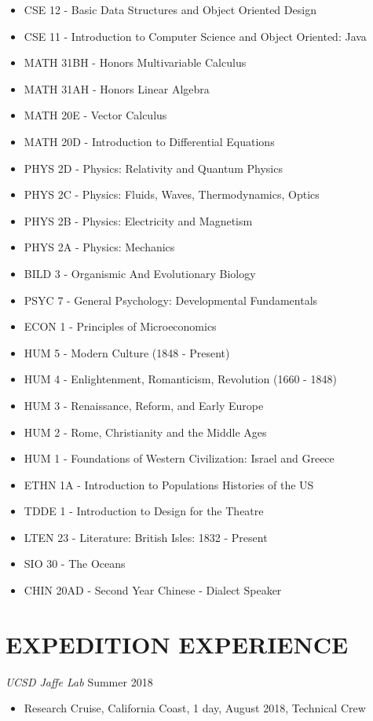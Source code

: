 \documentclass[line,margin]{res}
\begin{document}
\begin{resume}
\begin{itemize}
		\item CSE 12 - Basic Data Structures and Object Oriented Design
		\item CSE 11 - Introduction to Computer Science and Object Oriented: Java
		\item MATH 31BH - Honors Multivariable Calculus
		\item MATH 31AH - Honors Linear Algebra
		\item MATH 20E - Vector Calculus
		\item MATH 20D - Introduction to Differential Equations
		\item PHYS 2D - Physics: Relativity and Quantum Physics
		\item PHYS 2C - Physics: Fluids, Waves, Thermodynamics, Optics
		\item PHYS 2B - Physics: Electricity and Magnetism
		\item PHYS 2A - Physics: Mechanics
		\item BILD 3 - Organismic And Evolutionary Biology
		\item PSYC 7 - General Psychology: Developmental Fundamentals
		\item ECON 1 - Principles of Microeconomics
		\item HUM 5 - Modern Culture (1848 - Present)
		\item HUM 4 - Enlightenment, Romanticism, Revolution (1660 - 1848)
		\item HUM 3 - Renaissance, Reform, and Early Europe
		\item HUM 2 - Rome, Christianity and the Middle Ages
		\item HUM 1 - Foundations of Western Civilization: Israel and Greece
		\item ETHN 1A - Introduction to Populations Histories of the US
		\item TDDE 1 - Introduction to Design for the Theatre
		\item LTEN 23 - Literature: British Isles: 1832 - Present
		\item SIO 30 - The Oceans
		\item CHIN 20AD - Second Year Chinese - Dialect Speaker
	\end{itemize}

\section{EXPEDITION EXPERIENCE}
	{\sl UCSD Jaffe Lab} \hfill Summer 2018
	\begin{itemize}
		\item Research Cruise, California Coast, 1 day, August 2018, Technical Crew
	\end{itemize}


\end{resume}
\end{document}
